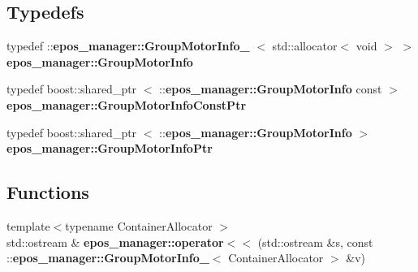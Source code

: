 \subsection*{\-Typedefs}
\begin{DoxyCompactItemize}
\item 
typedef \*
\-::{\bf epos\-\_\-manager\-::\-Group\-Motor\-Info\-\_\-}\*
$<$ std\-::allocator$<$ void $>$ $>$ {\bf epos\-\_\-manager\-::\-Group\-Motor\-Info}
\item 
typedef boost\-::shared\-\_\-ptr\*
$<$ \-::{\bf epos\-\_\-manager\-::\-Group\-Motor\-Info} \*
const  $>$ {\bf epos\-\_\-manager\-::\-Group\-Motor\-Info\-Const\-Ptr}
\item 
typedef boost\-::shared\-\_\-ptr\*
$<$ \-::{\bf epos\-\_\-manager\-::\-Group\-Motor\-Info} $>$ {\bf epos\-\_\-manager\-::\-Group\-Motor\-Info\-Ptr}
\end{DoxyCompactItemize}
\subsection*{\-Functions}
\begin{DoxyCompactItemize}
\item 
{\footnotesize template$<$typename Container\-Allocator $>$ }\\std\-::ostream \& {\bf epos\-\_\-manager\-::operator$<$$<$} (std\-::ostream \&s, const \-::{\bf epos\-\_\-manager\-::\-Group\-Motor\-Info\-\_\-}$<$ \-Container\-Allocator $>$ \&v)
\end{DoxyCompactItemize}
